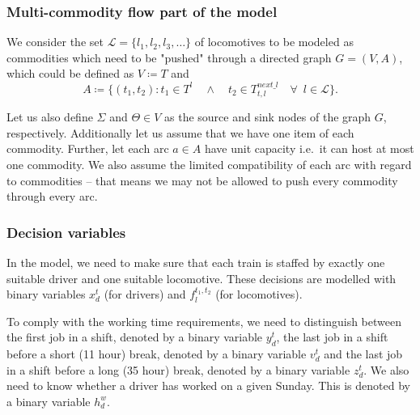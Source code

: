 \subsubsection{Multi-commodity flow part of the model}
\label{subsubsec:MulticommodityFlow}
We consider the set $\mathscr{L} = \{l_1, l_2, l_3, \ldots \}$ of locomotives to be modeled as commodities which need to be "pushed" through a directed graph $G = (V, A)$, which could be defined as $V\coloneqq T$ and 
\begin{equation}
    A \coloneqq \{(t_1, t_2): t_1 \in T^l \quad  \land \quad  t_2 \in T^{next\_l}_{t, l} \quad \forall \enspace l \in \mathscr{L}\}.
\end{equation}


Let us also define $\Sigma$ and $\Theta \in V$ as the source and sink nodes of the graph $G$, respectively.
Additionally let us assume that we have one item of each commodity.
Further, let each arc $a \in A$ have unit capacity i.e.\ it can host at most one commodity. We also assume the limited compatibility of each arc with regard to commodities -- that means we may not be allowed to push every commodity through every arc.

\subsubsection{Decision variables}
\label{subsubsec:Decision variables}
In the model, we need to make sure that each train is staffed by exactly one suitable driver and one suitable locomotive. These decisions are modelled with binary variables $x^t_{d}$ (for drivers) and $f^{t_1, t_2}_{l}$ (for locomotives).

To comply with the working time requirements, we need to distinguish between the first job in a shift, denoted by a binary variable $y^t_d$, the last job in a shift before a short (11 hour) break, denoted by a binary variable $v^t_d$ and the last job in a shift before a long (35 hour) break, denoted by a binary variable $z^t_d$. We also need to know whether a driver has worked on a given Sunday. This is denoted by a binary variable $h^{w}_{d}$.

